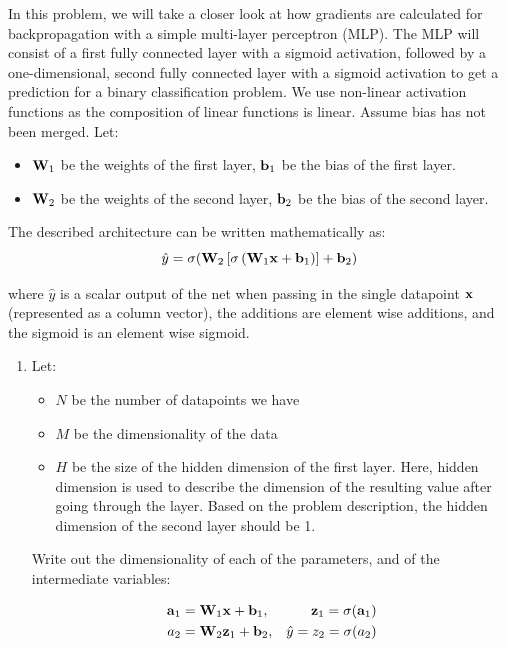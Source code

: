 \documentclass[submit]{../harvardml}
\begin{document}
\begin{problem}

In this problem, we will take a closer look at how gradients are calculated for backpropagation with a simple multi-layer perceptron (MLP). The MLP will consist of a first fully connected layer with a sigmoid activation, followed by a one-dimensional, second fully connected layer with a sigmoid activation to get a prediction for a binary classification problem. We use non-linear activation functions as the composition of linear functions is linear. Assume bias has not been merged. Let:
\begin{itemize}
  \item $\bold{W}_1$ be the weights of the first layer, $\bold{b}_1$ be the bias of the first layer.
  \item $\bold{W}_2$ be the weights of the second layer, $\bold{b}_2$ be the bias of the second layer.
\end{itemize}

The described architecture can be written mathematically as: $$\hat{y} = \sigma(\bold{W}_2 \left[\sigma \left(\bold{W}_1 \bold{x} + \bold{b}_1\right)\right] + \bold{b}_2)$$

where $\hat{y}$ is a scalar output of the net when passing in the single datapoint $\bold{x}$ (represented as a column vector), the additions are element wise additions, and the sigmoid is an element wise sigmoid.

\begin{enumerate}
  \item Let:
        \begin{itemize}
          \item $N$ be the number of datapoints we have
          \item $M$ be the dimensionality of the data
          \item $H$ be the size of the hidden dimension of the first layer. Here, hidden dimension is used to describe the dimension of the resulting value after going through the layer. Based on the problem description, the hidden dimension of the second layer should be 1.
        \end{itemize}

        Write out the dimensionality of each of the parameters, and of the intermediate variables:

        \begin{align*}
          \bold{a}_1 & = \bold{W}_1 \bold{x} + \bold{b}_1,
                     & \bold{z}_1 = \sigma(\bold{a}_1)       \\
          a_2        & = \bold{W}_2 \bold{z}_1 + \bold{b}_2,
                     & \hat{y} = z_2 = \sigma(a_2)
        \end{align*}


\end{enumerate}
\end{problem}
\end{document}
